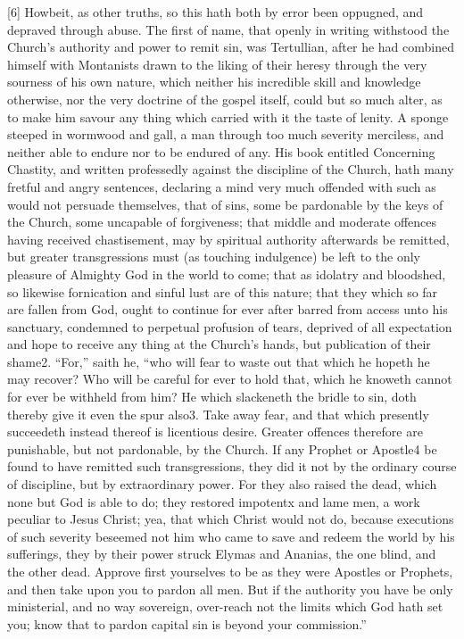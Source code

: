 [6] Howbeit, as other truths, so this hath both by error been oppugned, and depraved through abuse. The first of name, that openly in writing withstood the Church’s authority and power to remit sin, was Tertullian, after he had combined himself with Montanists drawn to the liking of their heresy through the very sourness of his own nature, which neither his incredible skill and knowledge otherwise, nor the very doctrine of the gospel itself, could but so much alter, as to make him savour any thing which carried with it the taste of lenity. A sponge steeped in wormwood and gall, a man through too much severity merciless, and neither able to endure nor to be endured of any. His book entitled Concerning Chastity, and written professedly against the discipline of the Church, hath many fretful and angry sentences, declaring a mind very much offended with such as would not persuade themselves, that of sins, some be pardonable by the keys of the Church, some uncapable of forgiveness; that middle and moderate offences having received chastisement, may by spiritual authority afterwards be remitted, but greater transgressions must (as touching indulgence) be left to the only pleasure of Almighty God in the world to come; that as idolatry and bloodshed, so likewise fornication and sinful lust  are of this nature; that they which so far are fallen from God, ought to continue for ever after barred from access unto his sanctuary, condemned to perpetual profusion of tears, deprived of all expectation and hope to receive any thing at the Church’s hands, but publication of their shame2. “For,” saith he, “who will fear to waste out that which he hopeth he may recover? Who will be careful for ever to hold that, which he knoweth cannot for ever be withheld from him? He which slackeneth the bridle to sin, doth thereby give it even the spur also3. Take away fear, and that which presently succeedeth instead thereof is licentious desire. Greater offences therefore are punishable, but not pardonable, by the Church. If any Prophet or Apostle4 be found to have remitted such transgressions, they did it not by the ordinary course of discipline, but by extraordinary power. For they also raised the dead, which none but God is able to do; they restored impotentx and lame men, a work peculiar to Jesus Christ; yea, that which Christ would not do, because executions of such severity beseemed not him who came to save and redeem the world by his sufferings, they by their power struck Elymas and Ananias, the one blind, and the other dead. Approve first yourselves to be as they were  Apostles or Prophets, and then take upon you to pardon all men. But if the authority you have be only ministerial, and no way sovereign, over-reach not the limits which God hath set you; know that to pardon capital sin is beyond your commission.”

